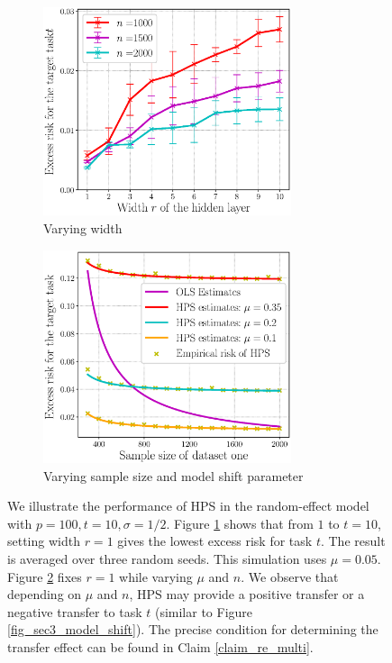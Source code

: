 \begin{figure}[!t]
	\begin{subfigure}[b]{0.5\textwidth}
		\centering
		\includegraphics[width=0.8\textwidth]{figures/multitask_width.eps}
		\caption{Varying width}
		\label{fig_sec4_width}
	\end{subfigure}
	\begin{subfigure}[b]{0.5\textwidth}
		\centering
		\includegraphics[width=0.8\textwidth]{figures/multitask_b.eps}
		\caption{Varying sample size and model shift parameter}
		\label{fig_sec4_transfer}
	\end{subfigure}
	\caption{We illustrate the performance of HPS in the random-effect model with $p = 100, t = 10, \sigma = 1/2$.
	Figure \ref{fig_sec4_width} shows that from $1$ to $t = 10$, setting width $r = 1$ gives the lowest excess risk for task $t$.
	The result is averaged over three random seeds.
	This simulation uses $\mu = 0.05$.
	Figure \ref{fig_sec4_transfer} fixes $r = 1$ while varying $\mu$ and $n$. We observe that depending on $\mu$ and $n$, HPS may provide a positive transfer or a negative transfer to task $t$ (similar to Figure \ref{fig_sec3_model_shift}). The precise condition for determining the transfer effect can be found in Claim \ref{claim_re_multi}.}
	\label{fig_sec4}
\end{figure}


